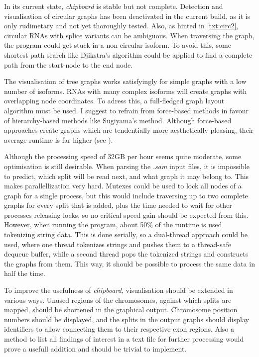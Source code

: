 \documentclass[11pt]{article}
\begin{document}
In its current state, \emph{chipboard} is stable but not complete. Detection and visualisation of
circular graphs has been deactivated in the current build, as it is only rudimetary and not
yet thoroughly tested. Also, as hinted in \ref{txt:circ2}, circular RNAs with splice variants can be
ambiguous. When traversing the graph, the program could get stuck in a non-circular isoform. To
avoid this, some shortest path search like Djikstra's algorithm could be applied to find a
complete path from the start-node to the end node.

The visualisation of tree graphs works satisfyingly for simple graphs with a low number of isoforms.
RNAs with many complex isoforms will create graphs with overlapping node coordinates. To adress
this, a full-fledged graph layout algorithm must be used. I suggest to refrain from force-based
methods in favour of hierarchy-based methods like Sugiyama's method.
Although force-based approaches create graphs which are tendentially more aesthetically
pleasing, their average runtime is far higher (see \cite{hbgraphs}).

Although the processing speed of 32GB per hour seems quite moderate, some optimisation is still desirable.
When parsing the \emph{.sam} input files, it is impossible to predict, which split will be read next,
and what graph it may belong to. This makes parallellization very hard. Mutexes could be used
to lock all nodes of a graph for a single process, but this would include traversing up to two
complete graphs for every split that is added, plus the time needed to wait for other processes
releasing locks, so no critical speed gain should be expected from this.
However, when running the program, about 50\% of the runtime is used tokenizing string data. This
is done serially, so a dual-thread approach could be used, where one thread tokenizes strings and
pushes them to a thread-safe dequeue buffer, while a second thread pops the tokenized strings and
constructs the graphs from them. This way, it should be possible to process the same data in half
the time.

To improve the usefulness of \emph{chipboard}, visualisation should be extended in various ways.
Unused regions of the chromosomes, against which splits are mapped, should be shortened in the
graphical output. Chromosome position numbers  should be displayed, and the splits in the output
graphs should display identifiers to allow connecting them to their respective exon regions.
Also a method to list all findings of interest in a text file for further processing would prove
a usefull addition and should be trivial to implement.
\end{document}
